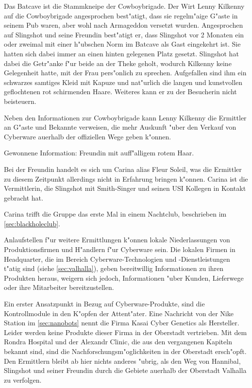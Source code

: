 
Das Batcave ist die Stammkneipe der Cowboybrigade. Der Wirt Lenny Kilkenny auf die Cowboybrigade angesprochen best"atigt, dass sie regelm"a\3ige G"aste in seinem Pub waren, aber wohl nach Armageddon versetzt wurden. Angesprochen auf Slingshot und seine Freundin best"atigt er, dass Slingshot vor 2 Monaten ein oder zweimal mit einer h"ubschen Norm im Batcave als Gast eingekehrt ist. Sie hatten sich dabei immer an einen hinten gelegenen Platz gesetzt. Slingshot hat dabei die Getr"anke f"ur beide an der Theke geholt, wodurch Kilkenny keine Gelegenheit hatte, mit der Frau pers"onlich zu sprechen. Aufgefallen sind ihm ein schwarzes samtiges Kleid mit Kapuze und nat"urlich die langen und kunstvollen geflochtenen rot schirmenden Haare. Weiteres kann er zu der Besucherin nicht beisteuern.

Neben den Informationen zur Cowboybrigade kann Lenny Kilkenny die Ermittler an G"aste und Bekannte verweisen, die mehr Auskunft "uber den Verkauf von Cyberware au\3erhalb der offiziellen Wege geben k"onnen.

\begin{remarks}
	Gewonnene Information: Freundin mit auff"alligem rotem Haar. 
	
	Bei der Freundin handelt es sich um Carina alias Fleur Soleil, was die Ermittler zu diesem Zeitpunkt allerdings nicht in Erfahrung bringen k"onnen. Carina ist die Vermittlerin, die Slingshot mit Smith-Singer und seinen USI Kollegen in Kontakt gebracht hat.

	Carina trifft die Gruppe das erste Mal in einem Nachtclub, beschrieben im \cref{sec:blackholeclub}.
\end{remarks}	


Anlaufstellen f"ur weitere Ermittlungen k"onnen lokale Niederlassungen von Produktionsfirmen und H"andlern f"ur Cyberware sein. Die lokalen Firmen in Headquarter, die im Bereich Cyberware-Technologien und -Dienstleistungen t"atig sind (siehe \cref{sec:valhalla}), geben bereitwillig Informationen zu ihren Produkten heraus, weigern sich jedoch, Informationen "uber Kunden, Lieferwege oder ihre Mitarbeiter bereitzustellen.

Ein erster Ansatzpunkt in Bezug auf Cyberware-Produkte, sind die Kontrollmodule in den K"opfen der Attent"ater. Eine Nachricht von der Nike Station im \cref{sec:nanobots} nennt die Firma Kasai Cyber Genetics als Hersteller. Leider werden keine Produkte dieser Firma in der Oberstadt vertrieben. Mit dem Rondra Hospital und der Alexandr Clinic, die aus den vergangenen Kapiteln bekannt sind, sind die Nachforschungsm"oglichkeiten in der Oberstadt ersch"opft. Den Ermittlern bleibt ab hier nichts anderes "ubrig, als den Weg von Hannibal, Slingshot und seiner Freundin durch die Gebiete au\3erhalb der Oberstadt Valhalla zu verfolgen.

